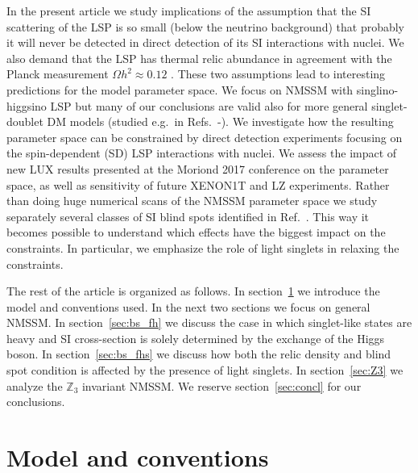 \documentclass[12pt,twoside]{article}
\begin{document}
In the present article we study implications of the assumption that the 
SI scattering of the LSP is so small (below the neutrino background) 
that probably it will never be detected in direct detection of its SI 
interactions with nuclei. We also demand that the LSP has thermal relic 
abundance in agreement with the Planck measurement
$\Omega h^2\approx0.12$ \cite{Planck}. These two assumptions lead to 
interesting predictions for the model parameter space. We focus on NMSSM with
singlino-higgsino LSP but many of our conclusions are valid also for more 
general singlet-doublet DM models (studied e.g.~in
Refs.~\cite{Cohen:2011ec}-\cite{Banerjee:2016hsk}). We investigate how the resulting parameter space can be constrained by direct detection
experiments focusing on the spin-dependent (SD) LSP interactions with nuclei. We assess the impact of new LUX results presented at the Moriond
2017 conference \cite{LUX_SD_n} on the parameter space, as well as sensitivity of future XENON1T and LZ experiments. Rather than doing huge
numerical scans of the NMSSM parameter space we study separately several classes of SI blind spots identified in Ref.~\cite{BS_NMSSM}. This way it
becomes possible to understand which effects have the biggest impact on the constraints. In particular, we emphasize the role of light singlets in
relaxing the constraints.


The rest of the article is organized as follows. In section~\ref{sec:model} we introduce the model and conventions used. In the next two sections we
focus on general NMSSM.  In section~\ref{sec:bs_fh} we discuss the case in which singlet-like states are heavy and SI cross-section is solely
determined by the exchange of the Higgs boson. In section~\ref{sec:bs_fhs} we discuss how both the relic density and blind spot condition is affected
by the presence of light singlets. In section~\ref{sec:Z3} we analyze the 
$\mathbb{Z}_3$ invariant NMSSM. We reserve section~\ref{sec:concl} for our
conclusions. 






\section{Model and conventions}
\label{sec:model}
\end{document}
